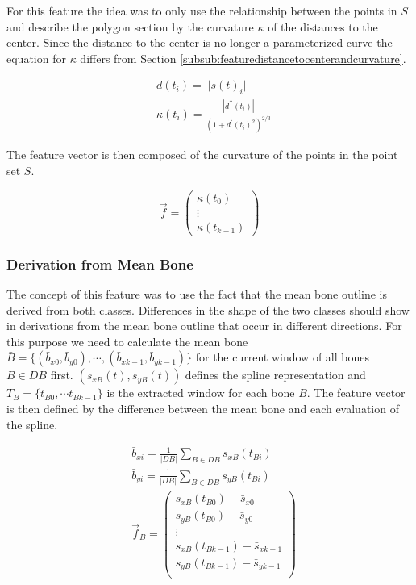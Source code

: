 \documentclass[pdftex,12pt,a4paper]{report}
\begin{document}
For this feature the idea was to only use the relationship between the points in $S$ and describe
the polygon section by the curvature $\kappa$ of the distances to the center. Since the distance 
to the center is no longer a parameterized curve the equation for $\kappa$ differs from
Section \ref{subsub:featuredistancetocenterandcurvature}.

\begin{equation}
\begin{split}
& d(t_i) = ||s(t)_i|| \\
& \kappa(t_i) = \frac{|d^{\prime\prime}(t_i)|}{(1 + d^\prime(t_i)^2)^{2/3}}
\end{split}
\end{equation}

The feature vector is then composed of the curvature of the points in the point set $S$.

\begin{equation}
\vec{f} = \left( \begin{array}{c}
\kappa(t_0) \\
\vdots \\
\kappa(t_{k-1})
\end{array} \right)
\end{equation}

\subsubsection{Derivation from Mean Bone}

The concept of this feature was to use the fact that the mean bone outline is derived from both classes.
Differences in the shape of the two classes should show in derivations from the mean bone outline that
occur in different directions. For this purpose we need to calculate the mean bone $\bar{B} = \{ (\bar{b}_{x0}, \bar{b}_{y0}), \cdots, (\bar{b}_{xk-1}, \bar{b}_{yk-1}) \}$ for the current window of all bones $B \in DB$ first. $(s_{xB}(t), s_{yB}(t))$ defines the spline representation and $T_B = \{ t_{B0}, \cdots t_{Bk-1} \}$ is the extracted window for each bone $B$. The feature vector is then defined by the difference between the mean bone and
each evaluation of the spline.

\begin{equation}
\begin{split}
& \bar{b}_{xi} = \frac{1}{|DB|} \sum_{B \in DB} s_{xB}(t_{Bi}) \\
& \bar{b}_{yi} = \frac{1}{|DB|} \sum_{B \in DB} s_{yB}(t_{Bi}) \\
& \vec{f}_B = \left( \begin{array}{c}
s_{xB}(t_{B0}) - \bar{s}_{x0} \\
s_{yB}(t_{B0}) - \bar{s}_{y0} \\
\vdots \\
s_{xB}(t_{Bk-1}) - \bar{s}_{xk-1} \\
s_{yB}(t_{Bk-1}) - \bar{s}_{yk-1} \\
\end{array} \right)  
\end{split}
\end{equation}
\end{document}
